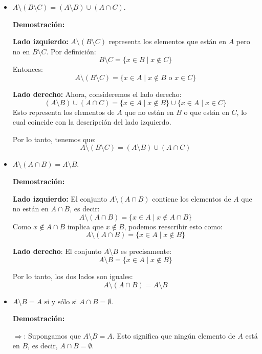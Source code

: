 \begin{solution}
    \begin{itemize}
        \item $A \setminus (B \setminus C) = (A \setminus B) \cup (A \cap C)$.

        \textbf{Demostración:}

        \textbf{Lado izquierdo:} \( A \setminus (B \setminus C) \) representa los elementos que están en \( A \) pero no en \( B \setminus C \). Por definición:
          \[
          B \setminus C = \{x \in B \mid x \notin C\}
          \]
          Entonces:
          \[
          A \setminus (B \setminus C) = \{x \in A \mid x \notin B \text{ o } x \in C\}
          \]
        
        \textbf{Lado derecho:} Ahora, consideremos el lado derecho:
          \[
          (A \setminus B) \cup (A \cap C) = \{x \in A \mid x \notin B\} \cup \{x \in A \mid x \in C\}
          \]
          Esto representa los elementos de \( A \) que no están en \( B \) o que están en \( C \), lo cual coincide con la descripción del lado izquierdo.
        
        Por lo tanto, tenemos que:
        \[
        A \setminus (B \setminus C) = (A \setminus B) \cup (A \cap C)
        \]
        \item $A \setminus (A \cap B) = A \setminus B$.

        \textbf{Demostración:}

        \textbf{Lado izquierdo:} El conjunto \( A \setminus (A \cap B) \) contiene los elementos de \( A \) que no están en \( A \cap B \), es decir:
          \[
          A \setminus (A \cap B) = \{x \in A \mid x \notin A \cap B\}
          \]
          Como \( x \notin A \cap B \) implica que \( x \notin B \), podemos reescribir esto como:
          \[
          A \setminus (A \cap B) = \{x \in A \mid x \notin B\}
          \]
        
        \textbf{Lado derecho}: El conjunto \( A \setminus B \) es precisamente:
          \[
          A \setminus B = \{x \in A \mid x \notin B\}
          \]
        
        Por lo tanto, los dos lados son iguales:
        \[
        A \setminus (A \cap B) = A \setminus B
        \]
        \item $A \setminus B = A \text{ si y sólo si } A \cap B = \emptyset$.

        \textbf{Demostración:}
        
        \(\Rightarrow\): Supongamos que \( A \setminus B = A \). Esto significa que ningún elemento de \( A \) está en \( B \), es decir, \( A \cap B = \emptyset \).
        

\end{itemize}
\end{solution}
